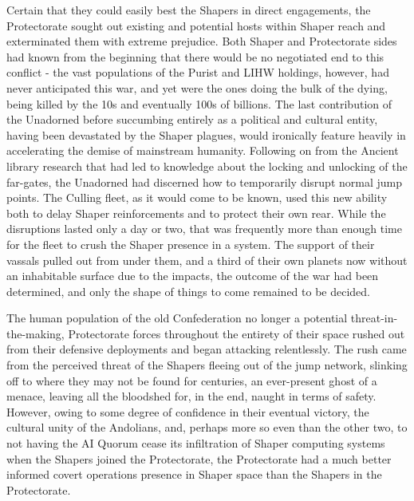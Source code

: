 Certain that they could easily best the Shapers in direct engagements,
the Protectorate sought out existing and potential hosts within Shaper
reach and exterminated them with extreme prejudice. Both Shaper and
Protectorate sides had known from the beginning that there would be no
negotiated end to this conflict - the vast populations of the Purist
and LIHW holdings, however, had never anticipated this war, and yet
were the ones doing the bulk of the dying, being killed by the 10s and
eventually 100s of billions. The last contribution of the Unadorned
before succumbing entirely as a political and cultural entity, having
been devastated by the Shaper plagues, would ironically feature
heavily in accelerating the demise of mainstream humanity. Following
on from the Ancient library research that had led to knowledge about
the locking and unlocking of the far-gates, the Unadorned had
discerned how to temporarily disrupt normal jump points. The Culling
fleet, as it would come to be known, used this new ability both to
delay Shaper reinforcements and to protect their own rear. While the
disruptions lasted only a day or two, that was frequently more than
enough time for the fleet to crush the Shaper presence in a
system. The support of their vassals pulled out from under them, and a
third of their own planets now without an inhabitable surface due to
the impacts, the outcome of the war had been determined, and only the
shape of things to come remained to be decided.

The human population of the old Confederation no longer a potential
threat-in-the-making, Protectorate forces throughout the entirety of
their space rushed out from their defensive deployments and began
attacking relentlessly. The rush came from the perceived threat of the
Shapers fleeing out of the jump network, slinking off to where they
may not be found for centuries, an ever-present ghost of a menace,
leaving all the bloodshed for, in the end, naught in terms of
safety. However, owing to some degree of confidence in their eventual
victory, the cultural unity of the Andolians, and, perhaps more so even
than the other two, to not having the AI Quorum cease its infiltration
of Shaper computing systems when the Shapers joined the Protectorate,
the Protectorate had a much better informed covert operations presence
in Shaper space than the Shapers in the Protectorate.

